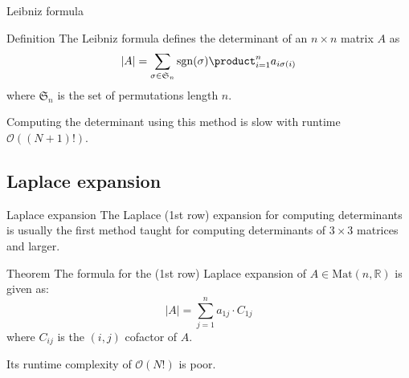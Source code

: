 \documentclass{beamer}
\begin{document}
\begin{frame}{Leibniz formula}
    \begin{block}{Definition}
        The Leibniz formula defines the determinant of an $n \times n$ matrix $A$ as
        \[
            |A| = \sum_{\sigma \in \mathfrak{S}_n} \mathrm{sgn}(\sigma)
            \product_{i=1}^n a_{i \sigma(i)}
        \]
        where $\mathfrak{S}_n$ is the set of permutations length $n$.
    \end{block}

    Computing the determinant using this method is slow with runtime $\mathcal{O}((N+1)!)$.
\end{frame}

\subsection{Laplace expansion}

\begin{frame}{Laplace expansion}
    The Laplace (1st row) expansion for computing determinants is usually the first method taught
    for computing determinants of $3 \times 3$ matrices and larger.

    \begin{block}{Theorem}
        The formula for the (1st row) Laplace expansion of $A \in \mathrm{Mat}(n, \mathbb{R})$
        is given as:
        \[
            |A| = \sum_{j=1}^n a_{1j}\cdot C_{1j}
        \]
        where $C_{ij}$ is the $(i, j)$ cofactor of $A$.
    \end{block}

    Its runtime complexity of $\mathcal{O}(N!)$ is poor.

\end{frame}
\end{document}
